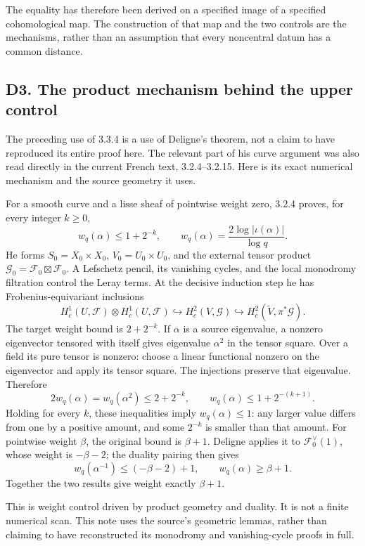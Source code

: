 \documentclass[
  11pt,
]{article}
\begin{document}
The equality has therefore been derived on a specified image of a
specified cohomological map. The construction of that map and the two
controls are the mechanisms, rather than an assumption that every
noncentral datum has a common distance.

\subsection{D3. The product mechanism behind the upper
control}\label{d3.-the-product-mechanism-behind-the-upper-control}

The preceding use of 3.3.4 is a use of Deligne's theorem, not a claim to
have reproduced its entire proof here. The relevant part of his curve
argument was also read directly in the current French text,
3.2.4--3.2.15. Here is its exact numerical mechanism and the source
geometry it uses.

For a smooth curve and a lisse sheaf of pointwise weight zero, 3.2.4
proves, for every integer \(k\ge0\), \[
w_q(\alpha)\le1+2^{-k},
\qquad
w_q(\alpha)=\frac{2\log|\iota(\alpha)|}{\log q}.
\] He forms \(S_0=X_0\times X_0\), \(V_0=U_0\times U_0\), and the
external tensor product
\(\mathcal G_0=\mathcal F_0\boxtimes\mathcal F_0\). A Lefschetz pencil,
its vanishing cycles, and the local monodromy filtration control the
Leray terms. At the decisive induction step he has Frobenius-equivariant
inclusions \[
H_c^1(U,\mathcal F)\otimes H_c^1(U,\mathcal F)
\hookrightarrow H_c^2(V,\mathcal G)
\hookrightarrow H_c^2(\widetilde V,\pi^*\mathcal G).
\] The target weight bound is \(2+2^{-k}\). If \(\alpha\) is a source
eigenvalue, a nonzero eigenvector tensored with itself gives eigenvalue
\(\alpha^2\) in the tensor square. Over a field its pure tensor is
nonzero: choose a linear functional nonzero on the eigenvector and apply
its tensor square. The injections preserve that eigenvalue. Therefore \[
2w_q(\alpha)=w_q(\alpha^2)\le2+2^{-k},
\qquad
w_q(\alpha)\le1+2^{-(k+1)}.
\] Holding for every \(k\), these inequalities imply
\(w_q(\alpha)\le1\): any larger value differs from one by a positive
amount, and some \(2^{-k}\) is smaller than that amount. For pointwise
weight \(\beta\), the original bound is \(\beta+1\). Deligne applies it
to \(\mathcal F_0^\vee(1)\), whose weight is \(-\beta-2\); the duality
pairing then gives \[
w_q(\alpha^{-1})\le(-\beta-2)+1,
\qquad w_q(\alpha)\ge\beta+1.
\] Together the two results give weight exactly \(\beta+1\).

This is weight control driven by product geometry and duality. It is not
a finite numerical scan. This note uses the source's geometric lemmas,
rather than claiming to have reconstructed its monodromy and
vanishing-cycle proofs in full.
\end{document}
